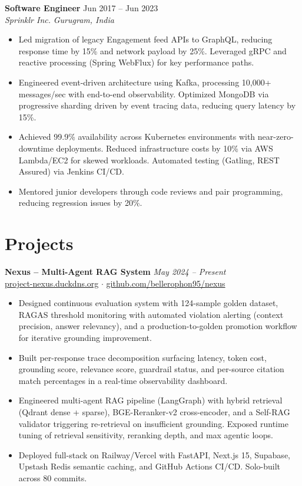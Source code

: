 \documentclass[10pt,letterpaper]{article}
\newcommand{\role}[4]{%
  \vspace{3pt}
  \noindent\textbf{#1} \hfill #2 \\
  \textit{#3} \hfill \textit{#4}
  \vspace{1pt}
}
\newcommand{\project}[3]{%
  \vspace{3pt}
  \noindent\textbf{#1} \hfill \textit{#2} \\
  {\small #3}
  \vspace{1pt}
}
\begin{document}
\role{Software Engineer}{Jun 2017 -- Jun 2023}{Sprinklr Inc.}{Gurugram, India}
\begin{itemize}
  \item Led migration of legacy Engagement feed APIs to GraphQL, reducing response time by 15\% and network payload by 25\%. Leveraged gRPC and reactive processing (Spring WebFlux) for key performance paths.
  \item Engineered event-driven architecture using Kafka, processing 10,000+ messages/sec with end-to-end observability. Optimized MongoDB via progressive sharding driven by event tracing data, reducing query latency by 15\%.
  \item Achieved 99.9\% availability across Kubernetes environments with near-zero-downtime deployments. Reduced infrastructure costs by 10\% via AWS Lambda/EC2 for skewed workloads. Automated testing (Gatling, REST Assured) via Jenkins CI/CD.
  \item Mentored junior developers through code reviews and pair programming, reducing regression issues by 20\%.
\end{itemize}

\section{Projects}

\project{Nexus -- Multi-Agent RAG System}{May 2024 -- Present}{\href{https://project-nexus.duckdns.org}{project-nexus.duckdns.org} $\cdot$ \href{https://github.com/bellerophon95/nexus}{github.com/bellerophon95/nexus}}
\begin{itemize}
  \item Designed continuous evaluation system with 124-sample golden dataset, RAGAS threshold monitoring with automated violation alerting (context precision, answer relevancy), and a production-to-golden promotion workflow for iterative grounding improvement.
  \item Built per-response trace decomposition surfacing latency, token cost, grounding score, relevance score, guardrail status, and per-source citation match percentages in a real-time observability dashboard.
  \item Engineered multi-agent RAG pipeline (LangGraph) with hybrid retrieval (Qdrant dense + sparse), BGE-Reranker-v2 cross-encoder, and a Self-RAG validator triggering re-retrieval on insufficient grounding. Exposed runtime tuning of retrieval sensitivity, reranking depth, and max agentic loops.
  \item Deployed full-stack on Railway/Vercel with FastAPI, Next.js 15, Supabase, Upstash Redis semantic caching, and GitHub Actions CI/CD. Solo-built across 80 commits.
\end{itemize}
\end{document}
